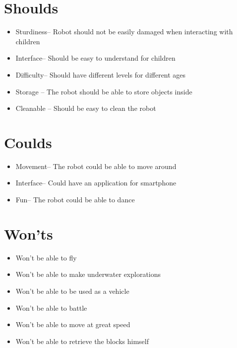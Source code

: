 \documentclass[11pt,twoside,a4paper]{report}
\begin{document}
\begin{appendices}
\section*{Shoulds}
\begin{itemize}
\item Sturdiness--        Robot should not be easily damaged when interacting with children
\item Interface--         Should be easy to understand for children
\item Difficulty--         Should have different levels for different ages
\item Storage --       The robot should be able to store objects inside
\item Cleanable --       Should be easy to clean the robot
\end{itemize}
\section*{Coulds}
\begin{itemize}
\item Movement--         The robot could be able to move around
\item Interface--         Could have an application for smartphone
\item Fun--             The robot could be able to dance
\end{itemize}
\section*{Won\rq{}ts}
\begin{itemize}
\item Won\rq{}t be able to fly
\item Won\rq{}t be able to make underwater explorations
\item Won\rq{}t be able to be used as a vehicle     
\item Won\rq{}t be able to battle
\item Won\rq{}t be able to move at great speed     
\item Won\rq{}t be able to retrieve the blocks himself

\end{itemize}


\end{appendices}
\end{document}
